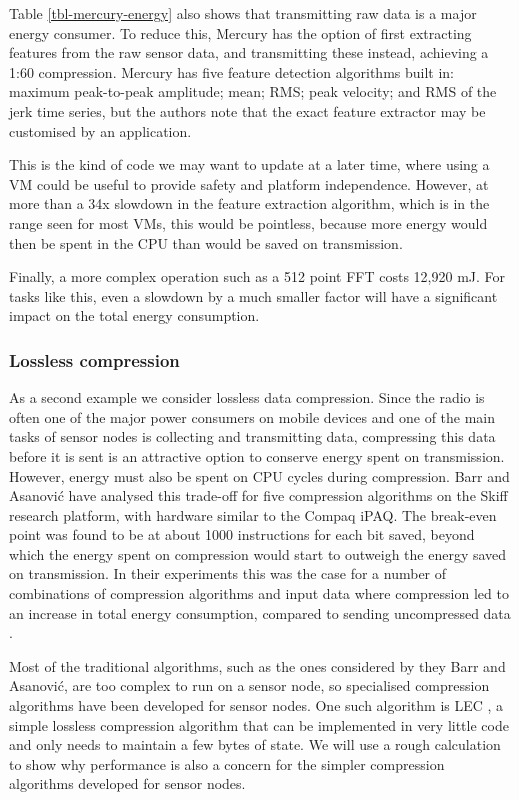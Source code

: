 Table \ref{tbl-mercury-energy} also shows that transmitting raw data is a major energy consumer. To reduce this, Mercury has the option of first extracting features from the raw sensor data, and transmitting these instead, achieving a 1:60 compression. Mercury has five feature detection algorithms built in: maximum peak-to-peak amplitude; mean; RMS; peak velocity; and RMS of the jerk time series, but the authors note that the exact feature extractor may be customised by an application.

This is the kind of code we may want to update at a later time, where using a VM could be useful to provide safety and platform independence. However, at more than a 34x slowdown in the feature extraction algorithm, which is in the range seen for most VMs, this would be pointless, because more energy would then be spent in the CPU than would be saved on transmission.

Finally, a more complex operation such as a 512 point FFT costs 12,920 mJ. For tasks like this, even a slowdown by a much smaller factor will have a significant impact on the total energy consumption.

\subsubsection{Lossless compression}
As a second example we consider lossless data compression. Since the radio is often one of the major power consumers on mobile devices and one of the main tasks of sensor nodes is collecting and transmitting data, compressing this data before it is sent is an attractive option to conserve energy spent on transmission. However, energy must also be spent on CPU cycles during compression. Barr and Asanovi\'c have analysed this trade-off for five compression algorithms on the Skiff research platform, with hardware similar to the Compaq iPAQ. The break-even point was found to be at about 1000 instructions for each bit saved, beyond which the energy spent on compression would start to outweigh the energy saved on transmission. In their experiments this was the case for a number of combinations of compression algorithms and input data where compression led to an increase in total energy consumption, compared to sending uncompressed data \cite{Barr:2006vg}.

Most of the traditional algorithms, such as the ones considered by they Barr and Asanovi\'c, are too complex to run on a sensor node, so specialised compression algorithms have been developed for sensor nodes. One such algorithm is LEC \cite{Marcelloni:2009ja}, a simple lossless compression algorithm that can be implemented in very little code and only needs to maintain a few bytes of state. We will use a rough calculation to show why performance is also a concern for the simpler compression algorithms developed for sensor nodes.

